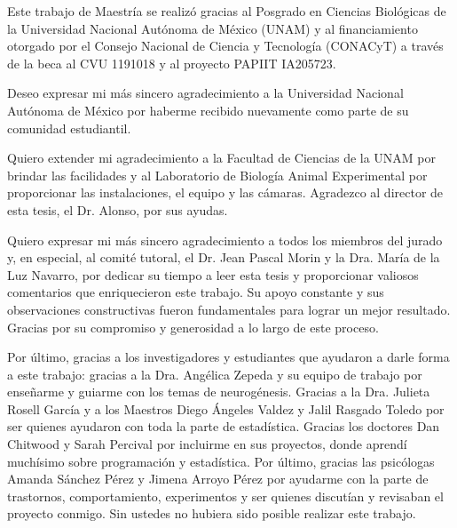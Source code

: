 Este trabajo de Maestría se realizó gracias al Posgrado en Ciencias Biológicas de la Universidad Nacional Autónoma de México (UNAM) y al financiamiento otorgado por el Consejo Nacional de Ciencia y Tecnología (CONACyT) a través de la beca al CVU 1191018 y al proyecto PAPIIT IA205723.

Deseo expresar mi más sincero agradecimiento a la Universidad Nacional Autónoma de México por haberme recibido nuevamente como parte de su comunidad estudiantil. 

Quiero extender mi agradecimiento a la Facultad de Ciencias de la UNAM por brindar las facilidades y al Laboratorio de Biología Animal Experimental por proporcionar las instalaciones, el equipo y las cámaras. Agradezco al director de esta tesis, el Dr. Alonso, por sus ayudas.

Quiero expresar mi más sincero agradecimiento a todos los miembros del jurado y, en especial, al comité tutoral, el Dr. Jean Pascal Morin y la Dra. María de la Luz Navarro, por dedicar su tiempo a leer esta tesis y proporcionar valiosos comentarios que enriquecieron este trabajo. Su apoyo constante y sus observaciones constructivas fueron fundamentales para lograr un mejor resultado. Gracias por su compromiso y generosidad a lo largo de este proceso.

Por último, gracias a los investigadores y estudiantes que ayudaron a darle forma a este trabajo: gracias a la Dra. Angélica Zepeda y su equipo de trabajo por enseñarme y guiarme con los temas de neurogénesis. Gracias a la Dra. Julieta Rosell García y a los Maestros Diego Ángeles Valdez y Jalil Rasgado Toledo por ser quienes ayudaron con toda la parte de estadística. Gracias los doctores Dan Chitwood y Sarah Percival por incluirme en sus proyectos, donde aprendí muchísimo sobre programación y estadística. Por último, gracias las psicólogas Amanda Sánchez Pérez y Jimena Arroyo Pérez por ayudarme con la parte de trastornos, comportamiento, experimentos y ser quienes discutían y revisaban el proyecto conmigo. Sin ustedes no hubiera sido posible realizar este trabajo.